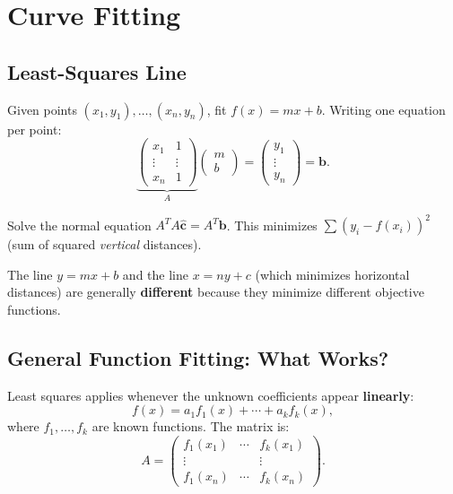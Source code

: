 \chapter{Curve Fitting}

\section{Least-Squares Line}

Given points $(x_1,y_1),\ldots,(x_n,y_n)$, fit $f(x)=mx+b$. Writing one equation per point:
\[
  \underbrace{\begin{pmatrix}x_1&1\\\vdots&\vdots\\x_n&1\end{pmatrix}}_{A}
  \begin{pmatrix}m\\b\end{pmatrix} = \begin{pmatrix}y_1\\\vdots\\y_n\end{pmatrix} = \mathbf{b}.
\]

Solve the normal equation $A^TA\hat{\mathbf{c}}=A^T\mathbf{b}$. This minimizes $\sum(y_i-f(x_i))^2$ (sum of squared \emph{vertical} distances).

\begin{remark}
The line $y=mx+b$ and the line $x=ny+c$ (which minimizes horizontal distances) are generally \textbf{different} because they minimize different objective functions.
\end{remark}

\section{General Function Fitting: What Works?}

Least squares applies whenever the unknown coefficients appear \textbf{linearly}:
\[
  f(x) = a_1 f_1(x) + \cdots + a_k f_k(x),
\]
where $f_1,\ldots,f_k$ are known functions. The matrix is:
\[
  A = \begin{pmatrix}f_1(x_1)&\cdots&f_k(x_1)\\\vdots&&\vdots\\f_1(x_n)&\cdots&f_k(x_n)\end{pmatrix}.
\]

